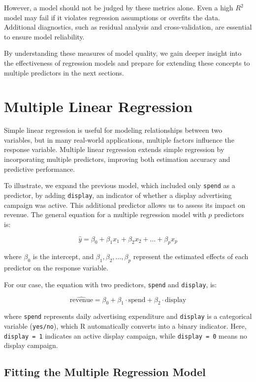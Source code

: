 \documentclass[
  11pt,
]{book}
\theoremstyle{definition}
\theoremstyle{definition}
\theoremstyle{definition}
\theoremstyle{definition}
\theoremstyle{remark}
\begin{document}
However, a model should not be judged by these metrics alone. Even a high \(R^2\) model may fail if it violates regression assumptions or overfits the data. Additional diagnostics, such as residual analysis and cross-validation, are essential to ensure model reliability.

By understanding these measures of model quality, we gain deeper insight into the effectiveness of regression models and prepare for extending these concepts to multiple predictors in the next sections.

\section{Multiple Linear Regression}\label{sec-multiple-regression}

Simple linear regression is useful for modeling relationships between two variables, but in many real-world applications, multiple factors influence the response variable. Multiple linear regression extends simple regression by incorporating multiple predictors, improving both estimation accuracy and predictive performance.

To illustrate, we expand the previous model, which included only \texttt{spend} as a predictor, by adding \texttt{display}, an indicator of whether a display advertising campaign was active. This additional predictor allows us to assess its impact on revenue. The general equation for a multiple regression model with \(p\) predictors is:

\[
\hat{y} = \beta_0 + \beta_1 x_1 + \beta_2 x_2 + \dots + \beta_p x_p
\]

where \(\beta_0\) is the intercept, and \(\beta_1, \beta_2, \dots, \beta_p\) represent the estimated effects of each predictor on the response variable.

For our case, the equation with two predictors, \texttt{spend} and \texttt{display}, is:

\[
\hat{\text{revenue}} = \beta_0 + \beta_1 \cdot \text{spend} + \beta_2 \cdot \text{display}
\]

where \texttt{spend} represents daily advertising expenditure and \texttt{display} is a categorical variable (\texttt{yes/no}), which R automatically converts into a binary indicator. Here, \texttt{display\ =\ 1} indicates an active display campaign, while \texttt{display\ =\ 0} means no display campaign.

\subsection*{Fitting the Multiple Regression Model}\label{fitting-the-multiple-regression-model}
\end{document}
